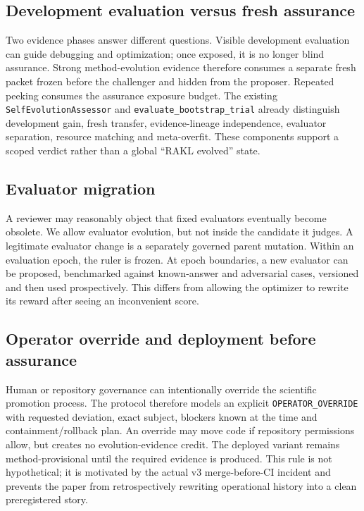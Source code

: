 \subsection{Development evaluation versus fresh assurance}

Two evidence phases answer different questions. Visible development evaluation can guide debugging and optimization; once exposed, it is no longer blind assurance. Strong method-evolution evidence therefore consumes a separate fresh packet frozen before the challenger and hidden from the proposer. Repeated peeking consumes the assurance exposure budget. The existing \texttt{SelfEvolutionAssessor} and \texttt{evaluate\_bootstrap\_trial} already distinguish development gain, fresh transfer, evidence-lineage independence, evaluator separation, resource matching and meta-overfit. These components support a scoped verdict rather than a global ``RAKL evolved'' state.

\subsection{Evaluator migration}

A reviewer may reasonably object that fixed evaluators eventually become obsolete. We allow evaluator evolution, but not inside the candidate it judges. A legitimate evaluator change is a separately governed parent mutation. Within an evaluation epoch, the ruler is frozen. At epoch boundaries, a new evaluator can be proposed, benchmarked against known-answer and adversarial cases, versioned and then used prospectively. This differs from allowing the optimizer to rewrite its reward after seeing an inconvenient score.

\subsection{Operator override and deployment before assurance}

Human or repository governance can intentionally override the scientific promotion process. The protocol therefore models an explicit \texttt{OPERATOR\_OVERRIDE} with requested deviation, exact subject, blockers known at the time and containment/rollback plan. An override may move code if repository permissions allow, but creates no evolution-evidence credit. The deployed variant remains method-provisional until the required evidence is produced. This rule is not hypothetical; it is motivated by the actual v3 merge-before-CI incident and prevents the paper from retrospectively rewriting operational history into a clean preregistered story.

